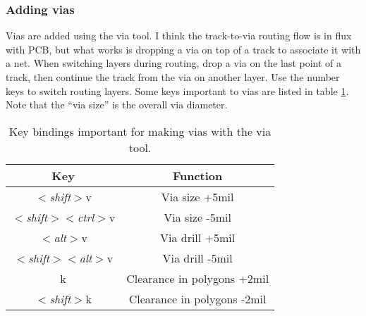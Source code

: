 \subsubsection{Adding vias}
Vias are added using the via tool.  I think the track-to-via routing
flow is in flux with PCB, but what works is dropping a via on top of a
track to associate it with a net.  When switching layers during
routing, drop a via on the last point of a track, then continue the
track from the via on another layer.  Use the number keys to switch
routing layers.  Some keys important to vias are listed in table
\ref{via_keys}.  Note that the ``via size'' is the overall via
diameter.
\begin{table}[htb]
  \begin{center}
    \begin{tabular}{|c|c|}\hline \hline
      Key	&Function \\ \hline

      $<$\textsl{shift}$>$v				&\parbox[c][1.5\height][c]{5cm}{Via size +5mil}\\ \hline
      $<$\textsl{shift}$>$$<$\textsl{ctrl}$>$v	&\parbox[c][1.5\height][c]{5cm}{Via size -5mil}\\ \hline
      $<$\textsl{alt}$>$v				&\parbox[c][1.5\height][c]{5cm}{Via drill +5mil}\\ \hline
      $<$\textsl{shift}$>$$<$\textsl{alt}$>$v		&\parbox[c][1.5\height][c]{5cm}{Via drill -5mil}\\ \hline
      k						&\parbox[c][1.5\height][c]{5cm}{Clearance in polygons +2mil}\\ \hline
      $<$\textsl{shift}$>$k				&\parbox[c][1.5\height][c]{5cm}{Clearance in polygons -2mil}\\ \hline
    \end{tabular}
  \end{center}
  \caption{Key bindings important for making vias with the via tool.\label{via_keys}}
\end{table}

